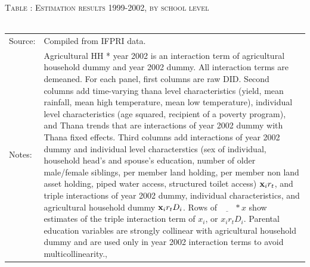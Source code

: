 \documentclass[12pt,letterpaper]{article}
\newcommand{\bfx}{\ensuremath{\mbox{\bf x}}}
\newcommand{\0}{\ensuremath{\mbox{\boldmath $0$}}}
\begin{document}
{\begin{table}\hfil\textsc{\footnotesize Table \thetable: Estimation results 1999-2002, by school level\label{MainGenderAgeGroup2Results}}\\\setlength{\tabcolsep}{.5pt}\renewcommand{\arraystretch}{.675}\hspace{-2em}\hfil\\\renewcommand{\arraystretch}{1}\hfil\begin{tabular}{>{\hfill\scriptsize}p{1cm}<{}>{\scriptsize}p{12cm}<{\hfill}} Source:& Compiled from IFPRI data. \\[-1ex] Notes:&   \textsf{Agricultural HH * year 2002} is an interaction term of agricultural household dummy and year 2002 dummy. All interaction terms are demeaned. For each panel, first columns are raw DID. Second columns add time-varying thana level characteristics (yield, mean rainfall, mean high temperature, mean low temperature), individual level characteristics (age squared, recipient of a poverty program), and \textsf{Thana trends} that are interactions of year 2002 dummy with Thana fixed effects. Third columns add interactions of year 2002 dummy and individual level characterstics (sex of individual, household head's and spouse's education, number of older male/female siblings, per member land holding, per member non land asset holding, piped water access, structured toilet access) $\bfx_{i}r_{t}$, and triple interactions of year 2002 dummy, individual characteristics, and agricultural household dummy $\bfx_{i}r_{t}D_{i}$. Rows of $\underline{\phantom{mm}}*x$ show estimates of the triple interaction term of $x_{i}$, or $x_{i}r_{t}D_{i}$. Parental education variables are strongly collinear with agricultural household dummy and are used only in year 2002 interaction terms to avoid multicollinearity., \\   \end{tabular} \end{table}



}
\end{document}
